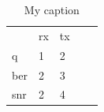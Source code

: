 \begin{table}[!htb]
\centering
\caption{My caption}
\label{my-label}
\begin{tabular}{lllll}
    & rx & tx &  &  \\
q   & 1  & 2  &  &  \\
ber & 2  & 3  &  &  \\
snr & 2  & 4  &  & 
\end{tabular}
\end{table}